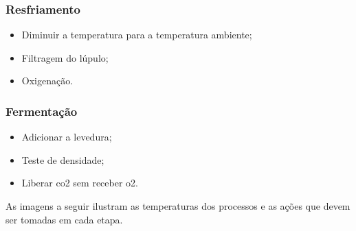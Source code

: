 \subsubsection{Resfriamento}
\begin{itemize}
    \item Diminuir a temperatura para a temperatura ambiente;
    \item Filtragem do lúpulo;
    \item Oxigenação.
\end{itemize}


\subsubsection{Fermentação}
\begin{itemize}
    \item Adicionar a levedura;
    \item Teste de densidade;
    \item Liberar co2 sem receber o2.
\end{itemize}

As imagens a seguir ilustram as temperaturas dos processos e as ações que devem ser tomadas em cada etapa.
